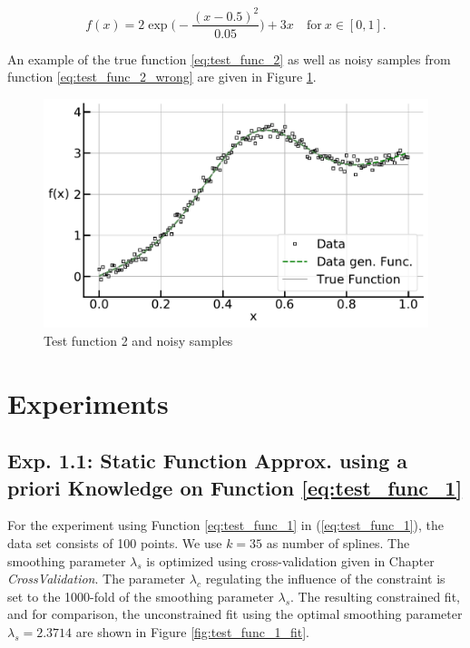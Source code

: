 \documentclass[10pt,a4paper]{article}
\begin{document}
\begin{equation} \label{eq:test_func_2_wrong}
	f(x) = 2\exp \big(-\frac{(x-0.5)^2}{0.05} \big) + 3x  \quad \text{for} \ x \in [0, 1]. 
\end{equation}

An example of the true function \ref{eq:test_func_2} as well as noisy samples from function \ref{eq:test_func_2_wrong} are given in Figure \ref{fig:test_func_2}.

\begin{figure}[h]
	\centering
	\includegraphics[width=\columnwidth]{../thesisplots/exp_peak_data.pdf}
	\caption{Test function 2 and noisy samples}
	\label{fig:test_func_2}
\end{figure}

\section{Experiments}

\subsection{Exp. 1.1: Static Function Approx. using a priori Knowledge on Function \ref{eq:test_func_1}} \label{subsec:exp11}

For the experiment using Function \ref{eq:test_func_1} in (\ref{eq:test_func_1}), the data set consists of 100 points. We use $k=35$ as number of splines. The smoothing parameter $\lambda_s$ is optimized using cross-validation given in Chapter \emph{CrossValidation}. The parameter $\lambda_c$ regulating the influence of the constraint is set to the 1000-fold of the smoothing parameter $\lambda_s$. The resulting constrained fit, and for comparison, the unconstrained fit using the optimal smoothing parameter $\lambda_s = 2.3714$ are shown in Figure \ref{fig:test_func_1_fit}.
\end{document}
